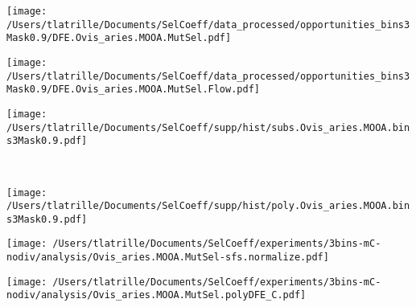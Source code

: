 \documentclass{article}
\begin{document}
    \begin{minipage}{0.32\linewidth}
        \texttt{[image: /Users/tlatrille/Documents/SelCoeff/data\_processed/opportunities\_bins3Mask0.9/DFE.Ovis\_aries.MOOA.MutSel.pdf]}
    \end{minipage}
    \begin{minipage}{0.32\linewidth}
        \texttt{[image: /Users/tlatrille/Documents/SelCoeff/data\_processed/opportunities\_bins3Mask0.9/DFE.Ovis\_aries.MOOA.MutSel.Flow.pdf]}
    \end{minipage}
    \begin{minipage}{0.32\linewidth}
        \texttt{[image: /Users/tlatrille/Documents/SelCoeff/supp/hist/subs.Ovis\_aries.MOOA.bins3Mask0.9.pdf]}
    \end{minipage}
    \\
    \begin{minipage}{0.32\linewidth}
        \texttt{[image: /Users/tlatrille/Documents/SelCoeff/supp/hist/poly.Ovis\_aries.MOOA.bins3Mask0.9.pdf]}
    \end{minipage}
    \begin{minipage}{0.32\linewidth}
        \texttt{[image: /Users/tlatrille/Documents/SelCoeff/experiments/3bins-mC-nodiv/analysis/Ovis\_aries.MOOA.MutSel-sfs.normalize.pdf]}
    \end{minipage}
    \begin{minipage}{0.32\linewidth}
        \texttt{[image: /Users/tlatrille/Documents/SelCoeff/experiments/3bins-mC-nodiv/analysis/Ovis\_aries.MOOA.MutSel.polyDFE\_C.pdf]}
    \end{minipage}
\end{document}
